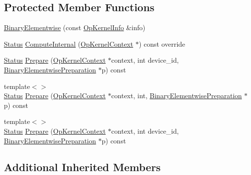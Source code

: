 \subsection*{Protected Member Functions}
\begin{DoxyCompactItemize}
\item 
\mbox{\hyperlink{classonnxruntime_1_1cuda_1_1BinaryElementwise_a5e501927ce96138fa54117f613657a7a}{Binary\+Elementwise}} (const \mbox{\hyperlink{classonnxruntime_1_1OpKernelInfo}{Op\+Kernel\+Info}} \&info)
\item 
\mbox{\hyperlink{classonnxruntime_1_1common_1_1Status}{Status}} \mbox{\hyperlink{classonnxruntime_1_1cuda_1_1BinaryElementwise_a63654a27650f1b9d96d6b97d40c8ba54}{Compute\+Internal}} (\mbox{\hyperlink{classonnxruntime_1_1OpKernelContext}{Op\+Kernel\+Context}} $\ast$) const override
\item 
\mbox{\hyperlink{classonnxruntime_1_1common_1_1Status}{Status}} \mbox{\hyperlink{classonnxruntime_1_1cuda_1_1BinaryElementwise_ab910a5bedfd2fe53ef82d618bf76c6bb}{Prepare}} (\mbox{\hyperlink{classonnxruntime_1_1OpKernelContext}{Op\+Kernel\+Context}} $\ast$context, int device\+\_\+id, \mbox{\hyperlink{structonnxruntime_1_1cuda_1_1BinaryElementwisePreparation}{Binary\+Elementwise\+Preparation}} $\ast$p) const
\item 
{\footnotesize template$<$$>$ }\\\mbox{\hyperlink{classonnxruntime_1_1common_1_1Status}{Status}} \mbox{\hyperlink{classonnxruntime_1_1cuda_1_1BinaryElementwise_a3783aa6f761a634f68f8601b7ce1116d}{Prepare}} (\mbox{\hyperlink{classonnxruntime_1_1OpKernelContext}{Op\+Kernel\+Context}} $\ast$context, int, \mbox{\hyperlink{structonnxruntime_1_1cuda_1_1BinaryElementwisePreparation}{Binary\+Elementwise\+Preparation}} $\ast$p) const
\item 
{\footnotesize template$<$$>$ }\\\mbox{\hyperlink{classonnxruntime_1_1common_1_1Status}{Status}} \mbox{\hyperlink{classonnxruntime_1_1cuda_1_1BinaryElementwise_ab158e192cd4f7e19992ecbd21be5ecad}{Prepare}} (\mbox{\hyperlink{classonnxruntime_1_1OpKernelContext}{Op\+Kernel\+Context}} $\ast$context, int device\+\_\+id, \mbox{\hyperlink{structonnxruntime_1_1cuda_1_1BinaryElementwisePreparation}{Binary\+Elementwise\+Preparation}} $\ast$p) const
\end{DoxyCompactItemize}
\subsection*{Additional Inherited Members}


